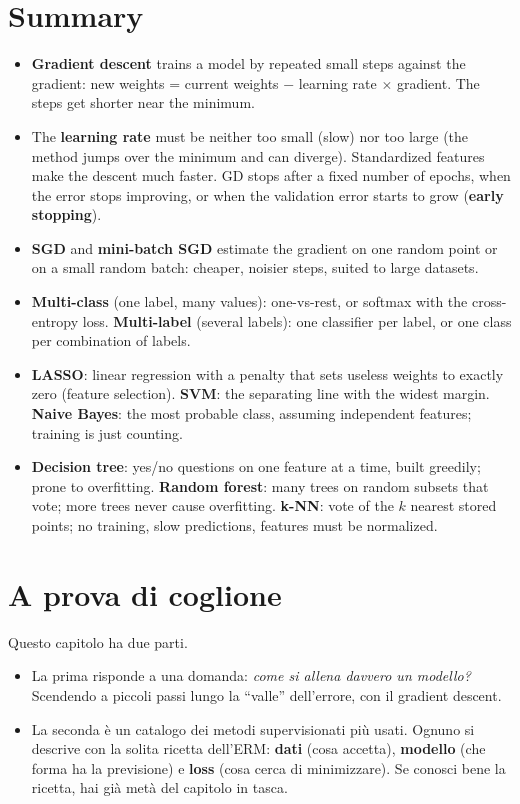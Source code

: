 \section{Summary}
\begin{itemize}
    \item \textbf{Gradient descent} trains a model by repeated small steps against the gradient: new weights = current weights $-$ learning rate $\times$ gradient. The steps get shorter near the minimum.
    \item The \textbf{learning rate} must be neither too small (slow) nor too large (the method jumps over the minimum and can diverge). Standardized features make the descent much faster. GD stops after a fixed number of epochs, when the error stops improving, or when the validation error starts to grow (\textbf{early stopping}).
    \item \textbf{SGD} and \textbf{mini-batch SGD} estimate the gradient on one random point or on a small random batch: cheaper, noisier steps, suited to large datasets.
    \item \textbf{Multi-class} (one label, many values): one-vs-rest, or softmax with the cross-entropy loss. \textbf{Multi-label} (several labels): one classifier per label, or one class per combination of labels.
    \item \textbf{LASSO}: linear regression with a penalty that sets useless weights to exactly zero (feature selection). \textbf{SVM}: the separating line with the widest margin. \textbf{Naive Bayes}: the most probable class, assuming independent features; training is just counting.
    \item \textbf{Decision tree}: yes/no questions on one feature at a time, built greedily; prone to overfitting. \textbf{Random forest}: many trees on random subsets that vote; more trees never cause overfitting. \textbf{k-NN}: vote of the $k$ nearest stored points; no training, slow predictions, features must be normalized.
\end{itemize}



\section{A prova di coglione}
Questo capitolo ha due parti.
\begin{itemize}
    \item La prima risponde a una domanda: \emph{come si allena davvero un modello?} Scendendo a piccoli passi lungo la ``valle'' dell'errore, con il gradient descent.
    \item La seconda è un catalogo dei metodi supervisionati più usati. Ognuno si descrive con la solita ricetta dell'ERM: \textbf{dati} (cosa accetta), \textbf{modello} (che forma ha la previsione) e \textbf{loss} (cosa cerca di minimizzare). Se conosci bene la ricetta, hai già metà del capitolo in tasca.
\end{itemize}

